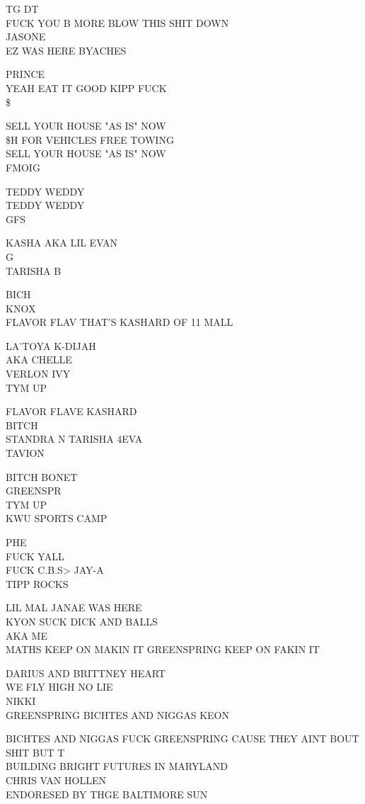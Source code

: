 \documentclass[10pt,letterpaper]{article}
\begin{document}
TG DT\\
FUCK YOU B MORE BLOW THIS SHIT DOWN\\
JASONE\\
EZ WAS HERE BYACHES

PRINCE\\
YEAH EAT IT GOOD KIPP FUCK\\
\$

SELL YOUR HOUSE "AS IS" NOW\\
\$H FOR VEHICLES FREE TOWING\\
SELL YOUR HOUSE "AS IS" NOW\\
FMOIG

TEDDY WEDDY\\
TEDDY WEDDY\\
GFS

KASHA AKA LIL EVAN\\
G\\
TARISHA B

BICH\\
KNOX\\
FLAVOR FLAV THAT'S KASHARD OF 11 MALL

LA'TOYA K{-}DIJAH\\
AKA CHELLE\\
VERLON IVY\\
TYM UP

FLAVOR FLAVE KASHARD\\
BITCH\\
STANDRA N TARISHA 4EVA\\
TAVION

BITCH BONET\\
GREENSPR\\
TYM UP\\
KWU SPORTS CAMP

PHE\\
FUCK YALL\\
FUCK C.B.S> JAY{-}A\\
TIPP ROCKS

LIL MAL JANAE WAS HERE\\
KYON SUCK DICK AND BALLS\\
AKA ME\\
MATHS KEEP ON MAKIN IT GREENSPRING KEEP ON FAKIN IT

DARIUS AND BRITTNEY HEART\\
WE FLY HIGH NO LIE\\
NIKKI\\
GREENSPRING BICHTES AND NIGGAS KEON

BICHTES AND NIGGAS FUCK GREENSPRING CAUSE THEY AINT BOUT SHIT BUT T\\
BUILDING BRIGHT FUTURES IN MARYLAND\\
CHRIS VAN HOLLEN\\
ENDORESED BY THGE BALTIMORE SUN
\end{document}
